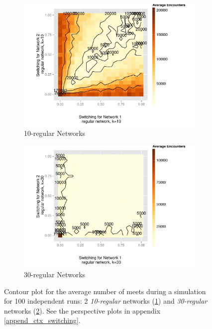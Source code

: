 \documentclass[preprint,number]{elsarticle}
\begin{document}
      \begin{figure}[H]
        \centering
	\begin{subfigure}{0.49\linewidth}
          \centering
          \includegraphics[width=1\linewidth]{"../analysis/pdf/context_switching_2_10_regular_switching_contour"}
          \caption{10-regular Networks}
          \label{fig:ctx_cs_2_10kreg}
	\end{subfigure}%
	\begin{subfigure}{0.49\linewidth}
          \centering
          \includegraphics[width=1\linewidth]{"../analysis/pdf/context_switching_2_30_regular_switching_contour"}
          \caption{30-regular Networks}
          \label{fig:ctx_cs_2_30kreg}
	\end{subfigure}
	
	\begin{minipage}{0.9\linewidth}
          \vspace{0.2cm}
          \caption{Contour plot for the average number of meets during a simulation for 100
            independent runs: 2 \textit{10-regular} networks (\ref{fig:ctx_cs_2_10kreg}) and
            \textit{30-regular} networks (\ref{fig:ctx_cs_2_30kreg}). See the perspective plots in
            appendix \ref{append_ctx_switching}.}
          \label{fig:ctx_cs_2_kregular}
	\end{minipage}
      \end{figure}
\end{document}
